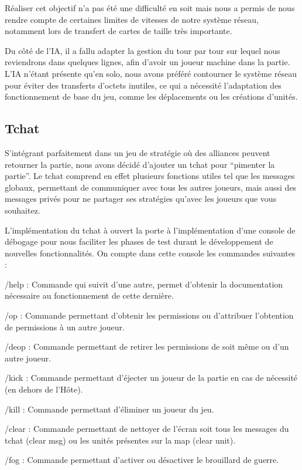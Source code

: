\documentclass[12pt]{report}
\begin{document}
Réaliser cet objectif n’a pas été une difficulté en soit mais nous a permis de
nous rendre compte de certaines limites de vitesses de notre système réseau,
notamment lors de transfert de cartes de taille très importante.

Du côté de l’IA, il a fallu adapter la gestion du tour par tour sur lequel nous
reviendrons dans quelques lignes, afin d’avoir un joueur machine dans la partie.
L’IA n’étant présente qu’en solo, nous avons préféré contourner le système
réseau pour éviter des transferts d’octets inutiles, ce qui a nécessité
l’adaptation des fonctionnement de base du jeu, comme les déplacements ou les
créations d’unités.

\subsection{Tchat}

S’intégrant parfaitement dans un jeu de stratégie où des alliances peuvent
retourner la partie, nous avons décidé d’ajouter un tchat pour “pimenter la
partie”. Le tchat comprend en effet plusieurs fonctions utiles tel que les
messages globaux, permettant de communiquer avec tous les autres joueurs, mais
aussi des messages privés pour ne partager ses stratégies qu’avec les joueurs
que vous souhaitez.

L’implémentation du tchat à ouvert la porte à l’implémentation d’une console de
débogage pour nous faciliter les phases de test durant le développement de
nouvelles fonctionnalités. On compte dans cette console les commandes suivantes
:

/help : Commande qui suivit d’une autre, permet d’obtenir la documentation
nécessaire au fonctionnement de cette dernière.

/op : Commande permettant d’obtenir les permissions ou d’attribuer l’obtention
de permissions à un autre joueur.

/deop : Commande permettant de retirer les permissions de soit même ou d’un
autre joueur.

/kick : Commande permettant d’éjecter un joueur de la partie en cas de nécessité
(en dehors de l’Hôte).

/kill : Commande permettant d’éliminer un joueur du jeu.

/clear : Commande permettant de nettoyer de l’écran soit tous les messages du
tchat (clear msg) ou les unités présentes sur la map (clear unit).

/fog : Commande permettant d’activer ou désactiver le brouillard de guerre.
\end{document}
